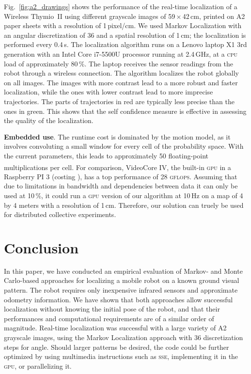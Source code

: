\documentclass{svmult}
\newcommand{\Fig}[1]{Fig.~\ref{fig:#1}}
\begin{document}
\Fig{a2_drawings} shows the performance of the real-time localization of a Wireless Thymio~II using different grayscale images of 59\,$\times$\,42\,cm, printed on A2 paper sheets with a resolution of 1\,pixel/cm.
We used Markov Localization with an angular discretization of 36 and a spatial resolution of 1\,cm; the localization is performed every 0.4\,s.
The localization algorithm runs on a Lenovo laptop X1 3rd generation with an Intel Core i7-5500U processor running at 2.4\,GHz, at a \textsc{cpu} load of approximately 80\,\%.
The laptop receives the sensor readings from the robot through a wireless connection.
The algorithm localizes the robot globally on all images.
The images with more contrast lead to a more robust and faster localization, while the ones with lower contrast lead to more imprecise trajectories.
The parts of trajectories in red are typically less precise than the ones in green.
This shows that the self confidence measure is effective in assessing the quality of the localization.

\textbf{Embedded use}.
The runtime cost is dominated by the motion model, as it involves convoluting a small window for every cell of the probability space.
With the current parameters, this leads to approximately 50 floating-point multiplications per cell.
For comparison, VideoCore\textsuperscript{\textregistered} IV, the built-in \textsc{gpu} in a Raspberry PI 3 (costing ), has a top performance of 28 \textsc{gflops}.
Assuming that due to limitations in bandwidth and dependencies between data it can only be used at 10\,\%, it could run a \textsc{gpu} version of our algorithm at 10\,Hz on a map of 4 by 4 meters with a resolution of 1\,cm.
Therefore, our solution can truely be used for distributed collective experiments.

\section{Conclusion}

In this paper, we have conducted an empirical evaluation of Markov- and Monte Carlo-based approaches for localizing a mobile robot on a known ground visual pattern.
The robot requires only inexpensive infrared sensors and approximate odometry information.
We have shown that both approaches allow successful localization without knowing the initial pose of the robot, and that their performances and computational requirements are of a similar order of magnitude.
Real-time localization was successful with a large variety of A2 grayscale images, using the Markov Localization approach with 36 discretization steps for angle.
Should larger patterns be desired, the code could be further optimized by using multimedia instructions such as \textsc{sse}, implementing it in the \textsc{gpu}, or parallelizing it.
\end{document}
